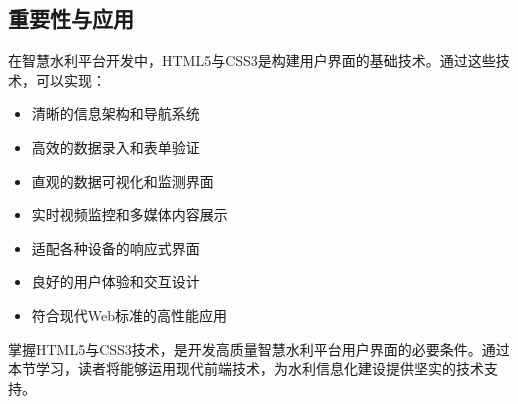 \subsection{重要性与应用}\label{ux91cdux8981ux6027ux4e0eux5e94ux7528}

在智慧水利平台开发中，HTML5与CSS3是构建用户界面的基础技术。通过这些技术，可以实现：

\begin{itemize}
\tightlist
\item
  清晰的信息架构和导航系统
\item
  高效的数据录入和表单验证
\item
  直观的数据可视化和监测界面
\item
  实时视频监控和多媒体内容展示
\item
  适配各种设备的响应式界面
\item
  良好的用户体验和交互设计
\item
  符合现代Web标准的高性能应用
\end{itemize}

掌握HTML5与CSS3技术，是开发高质量智慧水利平台用户界面的必要条件。通过本节学习，读者将能够运用现代前端技术，为水利信息化建设提供坚实的技术支持。
